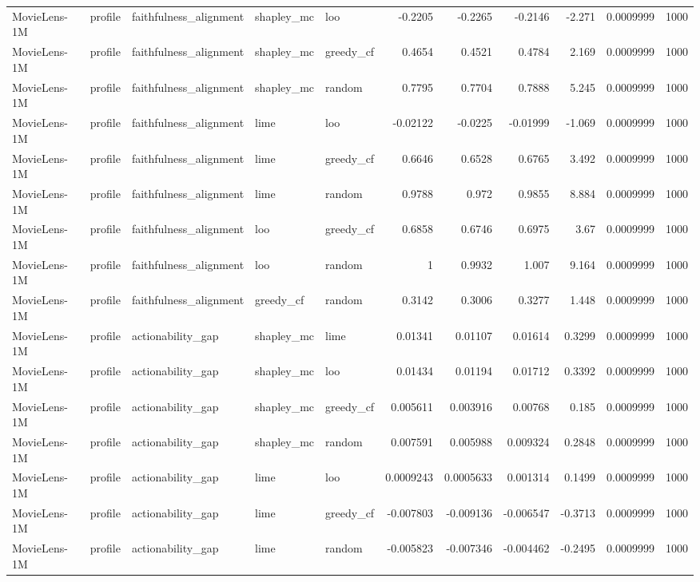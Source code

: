 \begin{table}[t]
\begin{tabular}{lllllrrrrrr}
MovieLens-1M & profile & faithfulness\_alignment & shapley\_mc & loo & -0.2205 & -0.2265 & -0.2146 & -2.271 & 0.0009999 & 1000 \\
MovieLens-1M & profile & faithfulness\_alignment & shapley\_mc & greedy\_cf & 0.4654 & 0.4521 & 0.4784 & 2.169 & 0.0009999 & 1000 \\
MovieLens-1M & profile & faithfulness\_alignment & shapley\_mc & random & 0.7795 & 0.7704 & 0.7888 & 5.245 & 0.0009999 & 1000 \\
MovieLens-1M & profile & faithfulness\_alignment & lime & loo & -0.02122 & -0.0225 & -0.01999 & -1.069 & 0.0009999 & 1000 \\
MovieLens-1M & profile & faithfulness\_alignment & lime & greedy\_cf & 0.6646 & 0.6528 & 0.6765 & 3.492 & 0.0009999 & 1000 \\
MovieLens-1M & profile & faithfulness\_alignment & lime & random & 0.9788 & 0.972 & 0.9855 & 8.884 & 0.0009999 & 1000 \\
MovieLens-1M & profile & faithfulness\_alignment & loo & greedy\_cf & 0.6858 & 0.6746 & 0.6975 & 3.67 & 0.0009999 & 1000 \\
MovieLens-1M & profile & faithfulness\_alignment & loo & random & 1 & 0.9932 & 1.007 & 9.164 & 0.0009999 & 1000 \\
MovieLens-1M & profile & faithfulness\_alignment & greedy\_cf & random & 0.3142 & 0.3006 & 0.3277 & 1.448 & 0.0009999 & 1000 \\
MovieLens-1M & profile & actionability\_gap & shapley\_mc & lime & 0.01341 & 0.01107 & 0.01614 & 0.3299 & 0.0009999 & 1000 \\
MovieLens-1M & profile & actionability\_gap & shapley\_mc & loo & 0.01434 & 0.01194 & 0.01712 & 0.3392 & 0.0009999 & 1000 \\
MovieLens-1M & profile & actionability\_gap & shapley\_mc & greedy\_cf & 0.005611 & 0.003916 & 0.00768 & 0.185 & 0.0009999 & 1000 \\
MovieLens-1M & profile & actionability\_gap & shapley\_mc & random & 0.007591 & 0.005988 & 0.009324 & 0.2848 & 0.0009999 & 1000 \\
MovieLens-1M & profile & actionability\_gap & lime & loo & 0.0009243 & 0.0005633 & 0.001314 & 0.1499 & 0.0009999 & 1000 \\
MovieLens-1M & profile & actionability\_gap & lime & greedy\_cf & -0.007803 & -0.009136 & -0.006547 & -0.3713 & 0.0009999 & 1000 \\
MovieLens-1M & profile & actionability\_gap & lime & random & -0.005823 & -0.007346 & -0.004462 & -0.2495 & 0.0009999 & 1000 \\

\end{tabular}
\end{table}
